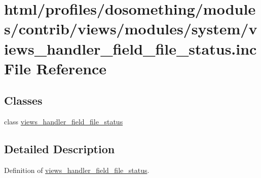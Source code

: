 \hypertarget{views__handler__field__file__status_8inc}{
\section{html/profiles/dosomething/modules/contrib/views/modules/system/views\_\-handler\_\-field\_\-file\_\-status.inc File Reference}
\label{views__handler__field__file__status_8inc}
}
\subsection*{Classes}
\begin{DoxyCompactItemize}
\item 
class \hyperlink{classviews__handler__field__file__status}{views\_\-handler\_\-field\_\-file\_\-status}
\end{DoxyCompactItemize}


\subsection{Detailed Description}
Definition of \hyperlink{classviews__handler__field__file__status}{views\_\-handler\_\-field\_\-file\_\-status}. 